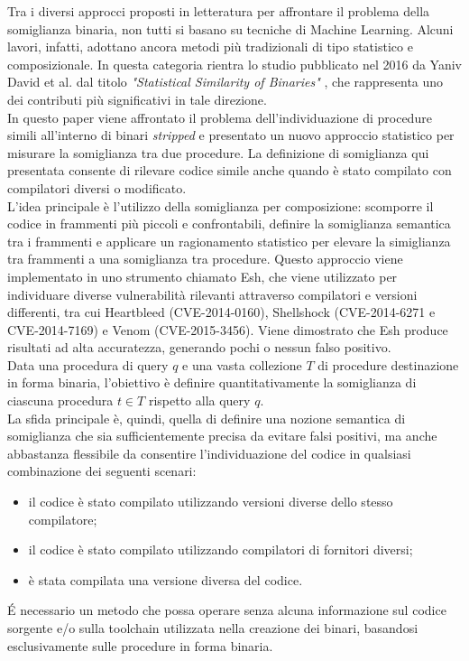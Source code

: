 \documentclass[12pt,a4paper,openright,twoside]{report}
\begin{document}
Tra i diversi approcci proposti in letteratura per affrontare il problema della
somiglianza binaria, non tutti si basano su tecniche di Machine Learning.
Alcuni lavori, infatti, adottano ancora metodi più tradizionali di tipo
statistico e composizionale. In questa categoria rientra lo studio pubblicato
nel 2016 da Yaniv David et al. dal titolo \textit{"Statistical Similarity of Binaries"} \cite{statisticalsob}, che rappresenta uno dei
contributi più significativi in tale direzione. \\
In questo paper viene affrontato il problema dell'individuazione di procedure simili all'interno di binari \textit{stripped} e presentato un nuovo approccio statistico per misurare la somiglianza tra due procedure. La definizione di somiglianza qui presentata consente di rilevare codice simile anche quando è stato compilato con compilatori diversi o modificato.\\
L'idea principale è l'utilizzo  della somiglianza per composizione: scomporre il codice in frammenti più piccoli e confrontabili, definire la somiglianza semantica tra i frammenti e applicare un ragionamento statistico per elevare la simiglianza tra frammenti a una somiglianza tra procedure. Questo approccio viene implementato in uno strumento chiamato Esh, che viene utilizzato per individuare diverse vulnerabilità rilevanti attraverso compilatori e versioni differenti, tra cui Heartbleed (CVE-2014-0160), Shellshock (CVE-2014-6271 e CVE-2014-7169) e Venom (CVE-2015-3456). Viene dimostrato che Esh produce risultati ad alta accuratezza, generando pochi o nessun falso positivo.\\
Data una procedura di query $q$ e una vasta collezione $T$ di procedure destinazione in forma binaria, l'obiettivo è definire quantitativamente la somiglianza di ciascuna procedura $t\in T$ rispetto alla query $q$.\\
La sfida principale è, quindi, quella di definire una nozione semantica di somiglianza che sia sufficientemente precisa da evitare falsi positivi, ma anche abbastanza flessibile da consentire l'individuazione del codice in qualsiasi combinazione dei seguenti scenari:
\begin{itemize}
    \item il codice è stato compilato utilizzando versioni diverse dello stesso compilatore;
    \item il codice è stato compilato utilizzando compilatori di fornitori diversi;
    \item è stata compilata una versione diversa del codice.
\end{itemize}
É necessario un metodo che possa operare senza alcuna informazione sul codice sorgente e/o sulla toolchain utilizzata nella creazione dei binari, basandosi esclusivamente sulle procedure in forma binaria.
\end{document}
